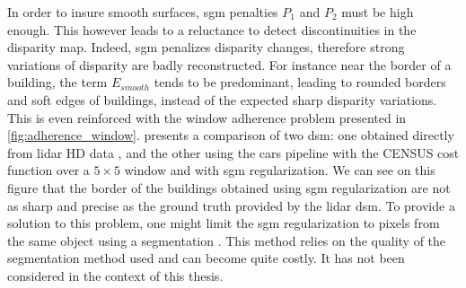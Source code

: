 In order to insure smooth surfaces, \acrshort{sgm} penalties $P_1$ and $P_2$ must be high enough. This however leads to a reluctance to detect discontinuities in the disparity map. Indeed, \acrshort{sgm} penalizes disparity changes, therefore strong variations of disparity are badly reconstructed. For instance near the border of a building, the term $E_{smooth}$ tends to be predominant, leading to rounded borders and soft edges of buildings, instead of the expected sharp disparity variations. This is even reinforced with the window adherence problem presented in \ref{fig:adherence_window}.  presents a comparison of two \acrshort{dsm}: one obtained directly from \acrshort{lidar} HD data \cite{monnet_lidarhd_2023}, and the other using the \acrshort{cars} pipeline with the CENSUS cost function over a $5\times5$ window and with \acrshort{sgm} regularization. We can see on this figure that the border of the buildings obtained using \acrshort{sgm} regularization are not as sharp and precise as the ground truth provided by the \acrshort{lidar} \acrshort{dsm}. To provide a solution to this problem, one might limit the \acrshort{sgm} regularization to pixels from the same object using a segmentation \cite{dumas_improving_2022}. This method relies on the quality of the segmentation method used and can become quite costly. It has not been considered in the context of this thesis.

